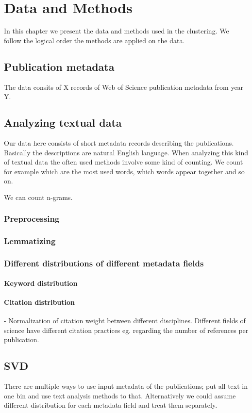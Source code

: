 \chapter{Data and Methods}
\label{chapter:methods}
In this chapter we present the data and methods used in the 
clustering. We follow the logical order the methods are applied on 
the data.

\section{Publication metadata}
The data consits of X records of Web of Science publication 
metadata from year Y.

\section{Analyzing textual data}
Our data here consists of short metadata records describing the 
publications. Basically the descriptions are natural English 
language. When analyzing this kind of textual data the often used
methods involve some kind of counting. We count for example which
are the most used words, which words appear together and so on.

We can count n-grams.
\subsection{Preprocessing}
\subsection{Lemmatizing}

\subsection{Different distributions of different metadata fields}
\subsubsection{Keyword distribution}
\subsubsection{Citation distribution}
- Normalization of citation weight between different disciplines.
  Different fields of science have different citation practices 
eg. regarding the number of references per publication. 
\cite{waltman_new_2012}


\section{SVD}
\label{sec:svd}
There are multiple ways to use input metadata of the publications; 
put all text in one bin and use text analysis methods to that. 
Alternatively we could assume different distribution for each 
metadata field  and treat them
separately.

